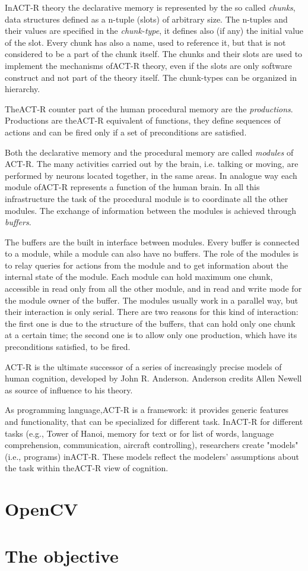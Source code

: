 In\mbox{ACT-R} theory the declarative memory is represented by the so called \emph{chunks}, data structures defined as a n-tuple (slots) of arbitrary size. The n-tuples and their values are specified in the \emph{chunk-type}, it defines also (if any) the initial value of the slot. Every chunk has also a name, used to reference it, but that is not considered to be a part of the chunk itself. The chunks and their slots are used to implement the mechanisms of\mbox{ACT-R} theory, even if the slots are only software construct and not part of the theory itself. The chunk-types can be organized in hierarchy.

The\mbox{ACT-R} counter part of the human procedural memory are the \emph{productions}. Productions are the\mbox{ACT-R} equivalent of functions, they define sequences of actions and can be fired only if a set of preconditions are satisfied. 

Both the declarative memory and the procedural memory are called \emph{modules} of \mbox{ACT-R}.  The many activities carried out by the brain, i.e. talking or moving, are performed by neurons located together, in the same areas. In analogue way each module of\mbox{ACT-R} represents a function of the human brain. In all this infrastructure the task of the procedural module is to coordinate all the other modules. The exchange of information between the modules is achieved through \emph{buffers}.

The buffers are the built in interface between modules. Every buffer is connected to a module, while a module can also have no buffers. The role of the modules is to relay queries for actions from the module and to get information about the internal state of the module. Each module can hold maximum one chunk, accessible in read only from all the other module, and in read and write mode for the module owner of the buffer. The modules usually work in a parallel way, but their interaction is only serial. There are two reasons for this kind of interaction: the first one is due to the structure of the buffers, that can hold only one chunk at a certain time; the second one is to allow only one production, which have its preconditions satisfied, to be fired.


ACT-R is the ultimate successor of a series of increasingly precise models of human cognition, developed by John R. Anderson. Anderson credits Allen Newell as source of influence to his theory.


As programming language,\mbox{ACT-R} is a framework: it provides generic features and functionality, that can be specialized for different task. In\mbox{ACT-R} for different tasks 
(e.g., Tower of Hanoi, memory for text or for list of words, language comprehension, 
communication, aircraft controlling), researchers create "models" (i.e., programs) in\mbox{ACT-R}. 
These models reflect the modelers' assumptions about the task within the\mbox{ACT-R} view of 
cognition.
\section{OpenCV}
\section{The objective}